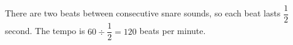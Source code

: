 There are two beats between consecutive snare sounds, so each beat lasts $\dfrac{1}{2}$ second. The tempo is $60\div\dfrac{1}{2}=\boxed{120}$ beats per minute.
